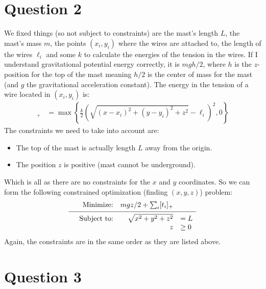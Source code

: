 \documentclass[a4paper, fleqn]{article}
\newcommand\vgap{\noalign{\vskip 0.1cm}}
\begin{document}
\section{Question 2}
We fixed things (so not subject to constraints) are the mast's length $L$, the mast's mass $m$, the points $(x_i, y_i)$ where the wires are attached to, the length of the wires $\ell_i$ and some $k$ to calculate the energies of the tension in the wires. If I understand gravitational potential energy correctly, it is $mgh/2$, where $h$ is the $z$-position for the top of the mast meaning $h/2$ is the center of mass for the mast (and $g$ the gravitational acceleration constant). The energy in the tension of a wire located in $(x_i,y_i)$ is:
\begin{align*}
  [t_i]_+ &= \max\left\{ \frac{k}{2}\left( \sqrt{(x-x_i)^2+(y-y_i)^2+z^2}-\ell_i\right)^2, 0\right\}
\end{align*}
The constraints we need to take into account are:
\begin{itemize}
  \item The top of the mast is actually length $L$ away from the origin.
  \item The position $z$ is positive (mast cannot be underground).
\end{itemize}
Which is all as there are no constraints for the $x$ and $y$ coordinates. So we can form the following constrained optimization (finding $(x,y,z)$) problem:
\begin{equation}
  \begin{array}{rrrl}
    &\text{Minimize:}   & mgz/2 + \sum_i [t_i]_+ & \\
    \vgap
    \hline
    \vgap
    &\text{Subject to:} & \sqrt{x^2+y^2+z^2} & = L \\
    &                   & z & \geq 0
  \end{array}
\end{equation}
Again, the constraints are in the same order as they are listed above.

\section{Question 3}
\end{document}
